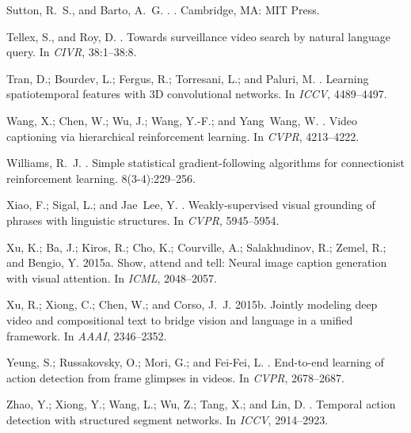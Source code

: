 \documentclass[letterpaper]{article} %
\begin{document}
\begin{thebibliography}{}
Sutton, R.~S., and Barto, A.~G.
.
.
\newblock Cambridge, MA: MIT Press.

Tellex, S., and Roy, D.
.
\newblock Towards surveillance video search by natural language query.
\newblock In {\em CIVR},  38:1--38:8.

Tran, D.; Bourdev, L.; Fergus, R.; Torresani, L.; and Paluri, M.
.
\newblock Learning spatiotemporal features with {3D} convolutional networks.
\newblock In {\em ICCV},  4489--4497.

Wang, X.; Chen, W.; Wu, J.; Wang, Y.-F.; and Yang~Wang, W.
.
\newblock Video captioning via hierarchical reinforcement learning.
\newblock In {\em CVPR},  4213--4222.

Williams, R.~J.
.
\newblock Simple statistical gradient-following algorithms for connectionist
  reinforcement learning.
 8(3-4):229--256.

Xiao, F.; Sigal, L.; and Jae~Lee, Y.
.
\newblock Weakly-supervised visual grounding of phrases with linguistic
  structures.
\newblock In {\em CVPR},  5945--5954.

Xu, K.; Ba, J.; Kiros, R.; Cho, K.; Courville, A.; Salakhudinov, R.; Zemel, R.;
  and Bengio, Y.
\newblock 2015a.
\newblock Show, attend and tell: Neural image caption generation with visual
  attention.
\newblock In {\em ICML},  2048--2057.

Xu, R.; Xiong, C.; Chen, W.; and Corso, J.~J.
\newblock 2015b.
\newblock Jointly modeling deep video and compositional text to bridge vision
  and language in a unified framework.
\newblock In {\em AAAI},  2346--2352.

Yeung, S.; Russakovsky, O.; Mori, G.; and Fei-Fei, L.
.
\newblock End-to-end learning of action detection from frame glimpses in
  videos.
\newblock In {\em CVPR},  2678--2687.

Zhao, Y.; Xiong, Y.; Wang, L.; Wu, Z.; Tang, X.; and Lin, D.
.
\newblock Temporal action detection with structured segment networks.
\newblock In {\em ICCV},  2914--2923.

\end{thebibliography}
\end{document}
